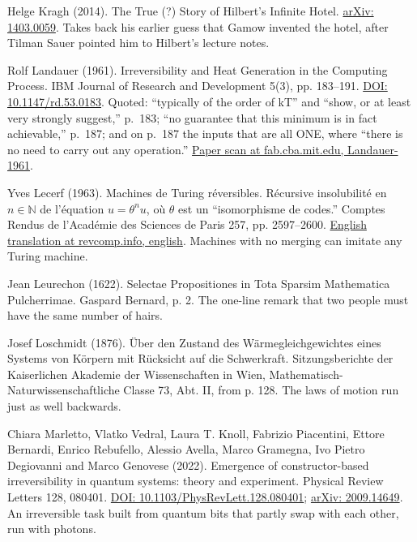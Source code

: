 \documentclass[11pt,twoside]{article}
\theoremstyle{thielethm}
\theoremstyle{thieledef}
\theoremstyle{thieledef}
\theoremstyle{thieledef}
\theoremstyle{thielethm}
\theoremstyle{thieleobs}
\theoremstyle{thielethm}
\begin{document}
\noindent Helge Kragh (2014). The True (?) Story of Hilbert's Infinite Hotel. \href{https://arxiv.org/abs/1403.0059}{arXiv: 1403.0059}. Takes back his earlier guess that Gamow invented the hotel, after Tilman Sauer pointed him to Hilbert's lecture notes.
\par\medskip

\noindent Rolf Landauer (1961). Irreversibility and Heat Generation in the Computing Process. IBM Journal of Research and Development 5(3), pp. 183--191. \href{https://doi.org/10.1147/rd.53.0183}{DOI: 10.1147/rd.53.0183}. Quoted: ``typically of the order of kT'' and ``show, or at least very strongly suggest,'' p.~183; ``no guarantee that this minimum is in fact achievable,'' p.~187; and on p.~187 the inputs that are all ONE, where ``there is no need to carry out any operation.'' \href{https://fab.cba.mit.edu/classes/862.22/notes/computation/Landauer-1961.pdf}{Paper scan at fab.cba.mit.edu, Landauer-1961}.
\par\medskip

\noindent Yves Lecerf (1963). Machines de Turing r\'eversibles. R\'ecursive insolubilit\'e en $n \in \mathbb{N}$ de l'\'equation $u = \theta^n u$, o\`u $\theta$ est un ``isomorphisme de codes.'' Comptes Rendus de l'Acad\'emie des Sciences de Paris 257, pp. 2597--2600. \href{https://revcomp.info/legacy/mpf/rc/Lecerf/english/english.html}{English translation at revcomp.info, english}. Machines with no merging can imitate any Turing machine.
\par\medskip

\noindent Jean Leurechon (1622). Selectae Propositiones in Tota Sparsim Mathematica Pulcherrimae. Gaspard Bernard, p. 2. The one-line remark that two people must have the same number of hairs.
\par\medskip

\noindent Josef Loschmidt (1876). \"Uber den Zustand des W\"armegleichgewichtes eines Systems von K\"orpern mit R\"ucksicht auf die Schwerkraft. Sitzungsberichte der Kaiserlichen Akademie der Wissenschaften in Wien, Mathematisch-Naturwissenschaftliche Classe 73, Abt. II, from p. 128. The laws of motion run just as well backwards.
\par\medskip

\noindent Chiara Marletto, Vlatko Vedral, Laura T. Knoll, Fabrizio Piacentini, Ettore Bernardi, Enrico Rebufello, Alessio Avella, Marco Gramegna, Ivo Pietro Degiovanni and Marco Genovese (2022). Emergence of constructor-based irreversibility in quantum systems: theory and experiment. Physical Review Letters 128, 080401. \href{https://doi.org/10.1103/PhysRevLett.128.080401}{DOI: 10.1103/PhysRevLett.128.080401}; \href{https://arxiv.org/abs/2009.14649}{arXiv: 2009.14649}. An irreversible task built from quantum bits that partly swap with each other, run with photons.
\par\medskip
\end{document}
